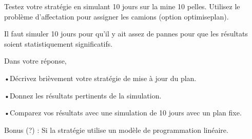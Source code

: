 Testez votre stratégie en simulant 10 jours sur la mine 10 pelles. Utilisez le problème d'affectation pour assigner les camions (option optimiseplan).

Il faut simuler 10 jours pour qu'il y ait assez de pannes pour que les résultats soient statistiquement significatifs.

Dans votre réponse, 

•Décrivez brièvement votre stratégie de mise à jour du plan.

•Donnez les résultats pertinents de la simulation.

•Comparez vos résultats avec une simulation de 10 jours avec un plan fixe. 

Bonus (?) : Si la stratégie utilise un modèle de programmation linéaire.
